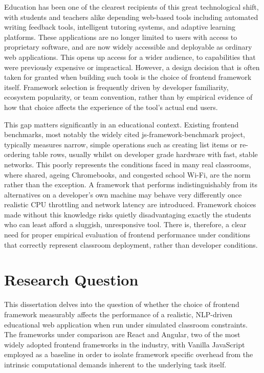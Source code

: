 \documentclass[11pt,a4paper]{report}
\begin{document}
\vspace{5mm}

Education has been one of the clearest recipients of this great technological shift, with students and teachers alike depending web-based tools including automated writing feedback tools, intelligent tutoring systems, and adaptive learning platforms. These applications are no longer limited to users with access to proprietary software, and are now widely accessible and deployable as ordinary web applications. This opens up access for a wider audience, to capabilities that were previously expensive or impractical. However, a design decision that is
often taken for granted when building such tools is the choice of frontend framework itself. Framework selection is frequently driven by developer familiarity, ecosystem popularity, or team convention, rather than by empirical evidence of how that choice affects the experience of the tool's actual end users.

\vspace{5mm}

This gap matters significantly in an educational context. Existing frontend benchmarks, most notably the widely cited js-framework-benchmark project, typically measures narrow, simple operations such as creating list items or re-ordering table rows, usually whilst on developer grade hardware with fast, stable networks. This poorly represents the conditions faced in many real classrooms, where shared, ageing Chromebooks, and congested school Wi-Fi, are the norm rather than the exception.  A
framework that performs indistinguishably from its alternatives on a developer's own machine may behave very differently once realistic CPU throttling and network latency are introduced. Framework choices made without this knowledge risks quietly disadvantaging exactly the students who can least afford a sluggish, unresponsive tool. There is, therefore, a clear need for proper empirical evaluation of frontend performance under conditions that correctly represent classroom deployment, rather than 
developer conditions.


\section{Research Question}

This dissertation delves into the question of whether the choice of frontend framework measurably affects the performance of a realistic, NLP-driven educational web application when run under simulated classroom constraints. The frameworks under comparison are React and Angular, two of the most widely adopted frontend frameworks in the industry, with Vanilla JavaScript employed as a baseline in order to isolate framework specific overhead from the intrinsic computational demands inherent to the underlying task itself. 
\end{document}

